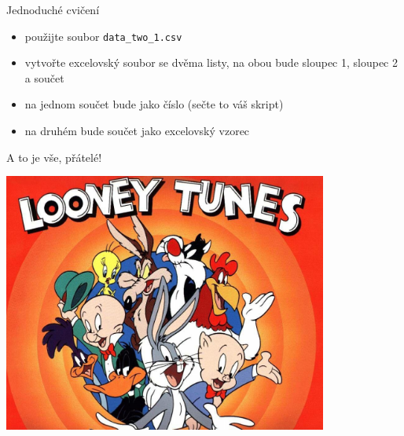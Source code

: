 \documentclass{beamer}
\begin{document}
\begin{frame}{Jednoduché cvičení}
  \begin{itemize}
    \item použijte soubor \texttt{data\_two\_1.csv}
    \item vytvořte excelovský soubor se dvěma listy, na obou bude sloupec 1, sloupec 2 a součet
    \item na jednom součet bude jako číslo (sečte to váš skript)
    \item na druhém bude součet jako excelovský vzorec
  \end{itemize}
\end{frame}

\begin{frame}{A to je vše, přátelé!}
  \begin{center}
    \includegraphics[width=0.8\textwidth]{looney_tunes}
  \end{center}
\end{frame}
\end{document}
